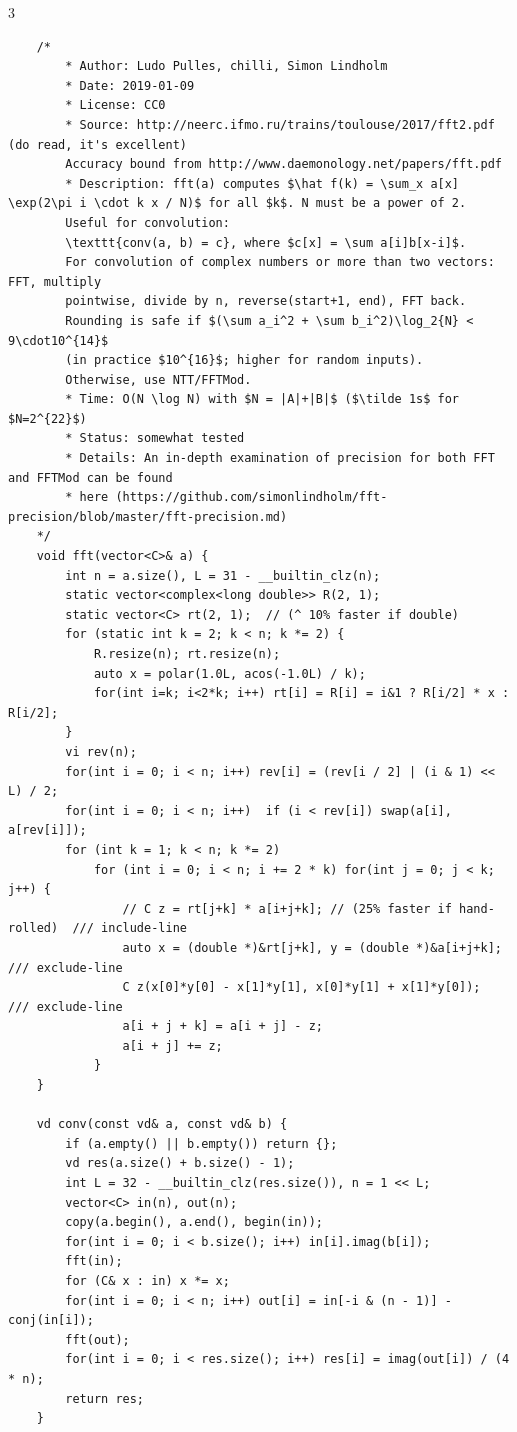 \documentclass[9pt, a4paper, notitlepage]{extreport}
\begin{document}
\begin{multicols}{3}
\begin{verbatim}
    /*
        * Author: Ludo Pulles, chilli, Simon Lindholm
        * Date: 2019-01-09
        * License: CC0
        * Source: http://neerc.ifmo.ru/trains/toulouse/2017/fft2.pdf (do read, it's excellent)
        Accuracy bound from http://www.daemonology.net/papers/fft.pdf
        * Description: fft(a) computes $\hat f(k) = \sum_x a[x] \exp(2\pi i \cdot k x / N)$ for all $k$. N must be a power of 2.
        Useful for convolution:
        \texttt{conv(a, b) = c}, where $c[x] = \sum a[i]b[x-i]$.
        For convolution of complex numbers or more than two vectors: FFT, multiply
        pointwise, divide by n, reverse(start+1, end), FFT back.
        Rounding is safe if $(\sum a_i^2 + \sum b_i^2)\log_2{N} < 9\cdot10^{14}$
        (in practice $10^{16}$; higher for random inputs).
        Otherwise, use NTT/FFTMod.
        * Time: O(N \log N) with $N = |A|+|B|$ ($\tilde 1s$ for $N=2^{22}$)
        * Status: somewhat tested
        * Details: An in-depth examination of precision for both FFT and FFTMod can be found
        * here (https://github.com/simonlindholm/fft-precision/blob/master/fft-precision.md)
    */
    void fft(vector<C>& a) {
        int n = a.size(), L = 31 - __builtin_clz(n);
        static vector<complex<long double>> R(2, 1);
        static vector<C> rt(2, 1);  // (^ 10% faster if double)
        for (static int k = 2; k < n; k *= 2) {
            R.resize(n); rt.resize(n);
            auto x = polar(1.0L, acos(-1.0L) / k);
            for(int i=k; i<2*k; i++) rt[i] = R[i] = i&1 ? R[i/2] * x : R[i/2];
        }
        vi rev(n);
        for(int i = 0; i < n; i++) rev[i] = (rev[i / 2] | (i & 1) << L) / 2;
        for(int i = 0; i < n; i++)  if (i < rev[i]) swap(a[i], a[rev[i]]);
        for (int k = 1; k < n; k *= 2)
            for (int i = 0; i < n; i += 2 * k) for(int j = 0; j < k; j++) {
                // C z = rt[j+k] * a[i+j+k]; // (25% faster if hand-rolled)  /// include-line
                auto x = (double *)&rt[j+k], y = (double *)&a[i+j+k];        /// exclude-line
                C z(x[0]*y[0] - x[1]*y[1], x[0]*y[1] + x[1]*y[0]);           /// exclude-line
                a[i + j + k] = a[i + j] - z;
                a[i + j] += z;
            }
    }
    
    vd conv(const vd& a, const vd& b) {
        if (a.empty() || b.empty()) return {};
        vd res(a.size() + b.size() - 1);
        int L = 32 - __builtin_clz(res.size()), n = 1 << L;
        vector<C> in(n), out(n);
        copy(a.begin(), a.end(), begin(in));
        for(int i = 0; i < b.size(); i++) in[i].imag(b[i]);
        fft(in);
        for (C& x : in) x *= x;
        for(int i = 0; i < n; i++) out[i] = in[-i & (n - 1)] - conj(in[i]);
        fft(out);
        for(int i = 0; i < res.size(); i++) res[i] = imag(out[i]) / (4 * n);
        return res;
    }


\end{verbatim}
\end{multicols}
\end{document}
